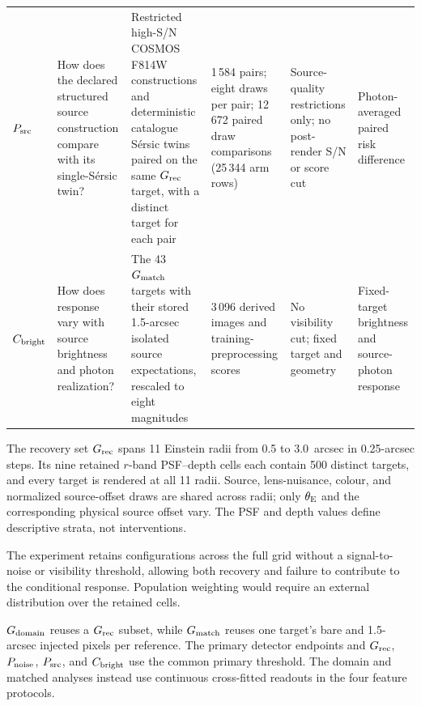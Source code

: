 \begin{table}
{\begin{tabular}{L{0.10\textwidth}L{0.18\textwidth}L{0.20\textwidth}L{0.14\textwidth}L{0.16\textwidth}L{0.15\textwidth}}
$P_{\rm src}$ &
How does the declared structured source construction compare with its
single-S\'{e}rsic twin? &
Restricted high-S/N COSMOS F814W constructions and deterministic catalogue
S\'{e}rsic twins paired on the same \(G_{\rm rec}\) target, with a distinct
target for each pair &
1\,584 pairs; eight draws per pair; 12\,672 paired draw comparisons
(25\,344 arm rows) &
Source-quality restrictions only; no post-render S/N or score cut &
Photon-averaged paired risk difference \\

$C_{\rm bright}$ &
How does response vary with source brightness and photon realization? &
The 43 \(G_{\rm match}\) targets with their stored 1.5-arcsec isolated source
expectations, rescaled to eight magnitudes &
3\,096 derived images and training-preprocessing scores &
No visibility cut; fixed target and geometry &
Fixed-target brightness and source-photon response \\
\bottomrule
\end{tabular}
}
\end{table}

The recovery set \(G_{\rm rec}\) spans 11 Einstein radii from 0.5 to
3.0~arcsec in 0.25-arcsec steps. Its nine retained \(r\)-band PSF--depth
cells each contain 500 distinct targets, and every target is rendered at all
11 radii. Source, lens-nuisance, colour, and normalized source-offset draws
are shared across radii; only \(\theta_{\rm E}\) and the corresponding
physical source offset vary. The PSF and depth values define descriptive
strata, not interventions.

The experiment retains configurations across the full grid without a
signal-to-noise or visibility threshold, allowing both recovery and failure
to contribute to the conditional response. Population weighting would require
an external distribution over the retained cells.

\(G_{\rm domain}\) reuses a \(G_{\rm rec}\) subset, while \(G_{\rm match}\)
reuses one target's bare and 1.5-arcsec injected pixels per reference. The
primary detector endpoints and \(G_{\rm rec}\), \(P_{\rm noise}\),
\(P_{\rm src}\), and \(C_{\rm bright}\) use the common primary threshold.
The domain and matched analyses instead use continuous cross-fitted readouts
in the four feature protocols.

